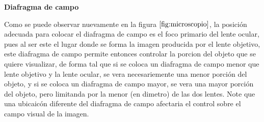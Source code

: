 \documentclass[letterpaper]{article}
\begin{document}
\textbf{Diafragma de campo}

Como se puede observar nuevamente en la figura $\ref{fig:microscopio}$, la posición adecuada para colocar el diafragma de campo es el foco primario del lente ocular, pues al ser este el lugar donde se forma la imagen producida por el lente objetivo, este diafragma de campo permite entonces controlar la porcion del objeto que se quiere visualizar, de forma tal que si se coloca un diafragma de campo menor que lente objetivo y la lente ocular, se vera necesariemente una menor porción del objeto, y si se coloca un diafragma de campo mayor, se vera una mayor porción del objeto, pero limitanda por la menor (en dimetro) de las dos lentes. Note que una ubicaicón diferente del diafragma de campo afectaria el control sobre el campo visual de la imagen.




\end{document}
